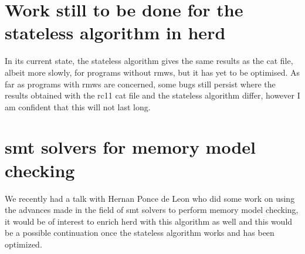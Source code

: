 \documentclass[a4,12pt]{article}
\begin{document}

\section{Work still to be done for the stateless algorithm in herd}

In its current state, the stateless algorithm gives the same results as the cat file, albeit more slowly, for programs without rmws, but it has yet to be optimised. As far as programs with rmws are concerned, some bugs still persist where the results obtained with the rc11 cat file and the stateless algorithm differ, however I am confident that this will not last long.

\section{smt solvers for memory model checking}

We recently had a talk with Hernan Ponce de Leon who did some work on using the advances made in the field of smt solvers to perform memory model checking, it would be of interest to enrich herd with this algorithm as well and this would be a possible continuation once the stateless algorithm works and has been optimized.
\end{document}
